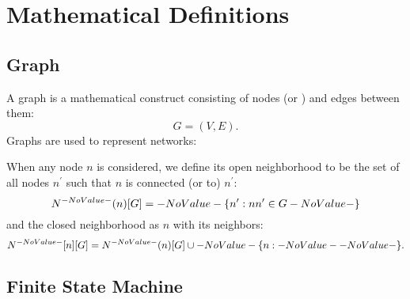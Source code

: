 \section{Mathematical Definitions}
\label{sec:math-defin}

\subsection{Graph}
\label{sec:math-defin:graphs}

A \gls{graph} is a mathematical construct
  consisting of \glspl{node} (or ) and \glspl{edge} between them:
  \[ G = (V, E). \]
Graphs are used to represent networks:

When any node $n$ is considered, we define its \gls{open neighborhood} to be
  the set of all nodes $n^\prime$ such that $n$ is connected (or  to) $n^\prime$:
  \[ \OpenNeighborhood{n}[G] = \Set{n^\prime}[nn^\prime \in G] \]
  and the \gls{closed neighborhood} as $n$ with its neighbors:
  \[ \ClosedNeighborhood{n}[G] = \OpenNeighborhood{n}[G] \cup \Set{n}. \]

\subsection{Finite State Machine}
\label{sec:math-define:fsm}

